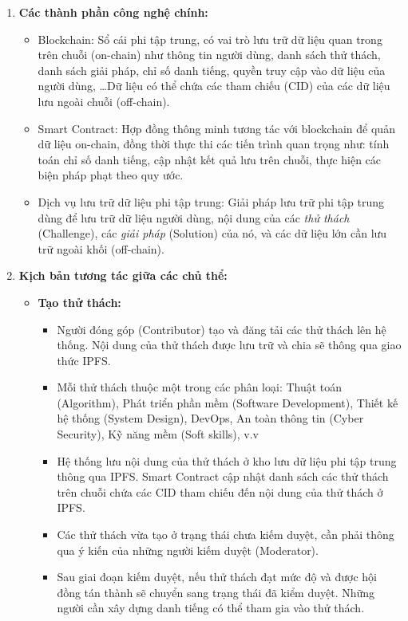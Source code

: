 \documentclass{article}[14pt]
\begin{document}
{            \begin{enumerate}[label=\textbf{\alph*.}]
                \item \textbf{Các thành phần công nghệ chính:}
                \begin{itemize}
                    \item Blockchain: Sổ cái phi tập trung, có vai trò lưu trữ dữ liệu quan trong trên chuỗi (on-chain) như thông tin người dùng, danh sách thử thách, danh sách giải pháp, chỉ số danh tiếng, quyền truy cập vào dữ liệu của người dùng, \dots Dữ liệu có thể chứa các tham chiếu (CID) của các dữ liệu lưu ngoài chuỗi (off-chain). 
                    \item Smart Contract: Hợp đồng thông minh tương tác với blockchain để quản dữ liệu on-chain, đồng thời thực thi các tiến trình quan trọng như: tính toán chỉ số danh tiếng, cập nhật kết quả lưu trên chuỗi, thực hiện các biện pháp phạt theo quy ước. 
                    \item Dịch vụ lưu trữ dữ liệu phi tập trung: Giải pháp lưu trữ phi tập trung dùng để lưu trữ dữ liệu người dùng, nội dung của các \textit{thử thách} (Challenge), các \textit{giải pháp} (Solution) của nó, và các dữ liệu lớn cần lưu trữ ngoài khối (off-chain).
                \end{itemize}
                    
                \item \textbf{Kịch bản tương tác giữa các chủ thể:}
                \begin{itemize}
                    \item \textbf{Tạo thử thách:}
                    \begin{itemize}
                        \item Người đóng góp (Contributor) tạo và đăng tải các thử thách lên hệ thống. Nội dung của thử thách được lưu trữ và chia sẽ thông qua giao thức IPFS.
                        \item Mỗi thử thách thuộc một trong các phân loại: Thuật toán (Algorithm), Phát triển phần mềm (Software Development), Thiết kế hệ thống (System Design), DevOps, An toàn thông tin (Cyber Security), Kỹ năng mềm (Soft skills), v.v
                        \item Hệ thống lưu nội dung của thử thách ở kho lưu dữ liệu phi tập trung thông qua IPFS. Smart Contract cập nhật danh sách các thử thách trên chuỗi chứa các CID tham chiếu đến nội dung của thử thách ở IPFS.  
                        \item Các thử thách vừa tạo ở trạng thái chưa kiếm duyệt, cần phải thông qua ý kiến của những người kiếm duyệt (Moderator). 
                        \item Sau giai đoạn kiếm duyệt, nếu thử thách đạt mức độ và được hội đồng tán thành sẽ chuyển sang trạng thái đã kiểm duyệt. Những người cần xây dựng danh tiếng có thể tham gia vào thử thách. 
                    \end{itemize}


\end{itemize}
\end{enumerate}}
\end{document}
